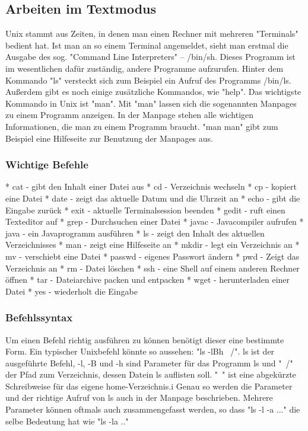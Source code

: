 \subsection {Arbeiten im Textmodus}
Unix stammt aus Zeiten, in denen man einen Rechner mit mehreren "Terminals" bedient hat. Ist man an so einem Terminal angemeldet, sieht man erstmal die Ausgabe des sog. "Command Line Interpreters" – /bin/sh. Dieses Programm ist im wesentlichen dafür zuständig, andere Programme aufzurufen. Hinter dem Kommando "ls" versteckt sich zum Beispiel ein Aufruf des Programms /bin/ls. Außerdem gibt es noch einige zusätzliche Kommandos, wie "help". Das wichtigste Kommando in Unix ist "man". Mit "man" lassen sich die sogenannten Manpages zu einem Programm anzeigen. In der Manpage stehen alle wichtigen Informationen, die man zu einem Programm braucht.
"man man" gibt zum Beispiel eine Hilfeseite zur Benutzung der Manpages aus.

\subsubsection {Wichtige Befehle}
* cat - gibt den Inhalt einer Datei aus
* cd - Verzeichnis wechseln
* cp - kopiert eine Datei
* date - zeigt das aktuelle Datum und die Uhrzeit an
* echo - gibt die Eingabe zurück
* exit - aktuelle Terminalsession beenden
* gedit - ruft einen Texteditor auf
* grep - Durchsuchen einer Datei
* javac - Javacompiler aufrufen
* java - ein Javaprogramm ausführen
* ls - zeigt den Inhalt des aktuellen Verzeichnisses
* man - zeigt eine Hilfeseite an
* mkdir - legt ein Verzeichnis an
* mv - verschiebt eine Datei
* passwd - eigenes Passwort ändern
* pwd - Zeigt das Verzeichnis an
* rm - Datei löschen
* ssh - eine Shell auf einem anderen Rechner öffnen
* tar - Dateiarchive packen und entpacken
* wget - herunterladen einer Datei
* yes - wiederholt die Eingabe

\subsubsection {Befehlssyntax}
Um einen Befehl richtig ausführen zu können benötigt dieser eine bestimmte Form. Ein typischer Unixbefehl könnte so aussehen:
"ls -lBh ~/". ls ist der ausgeführte Befehl, -l, -B und -h sind Parameter für das Programm ls und "~/" der Pfad zum Verzeichnis, dessen Datein ls auflisten soll. "~" ist eine abgekürzte Schreibweise für das eigene home-Verzeichnis.i
Genau so werden die Parameter und der richtige Aufruf von ls auch in der Manpage beschrieben. Mehrere Parameter können oftmals auch zusammengefasst werden, so dass "ls -l -a ..." die selbe Bedeutung hat wie "ls -la .."

